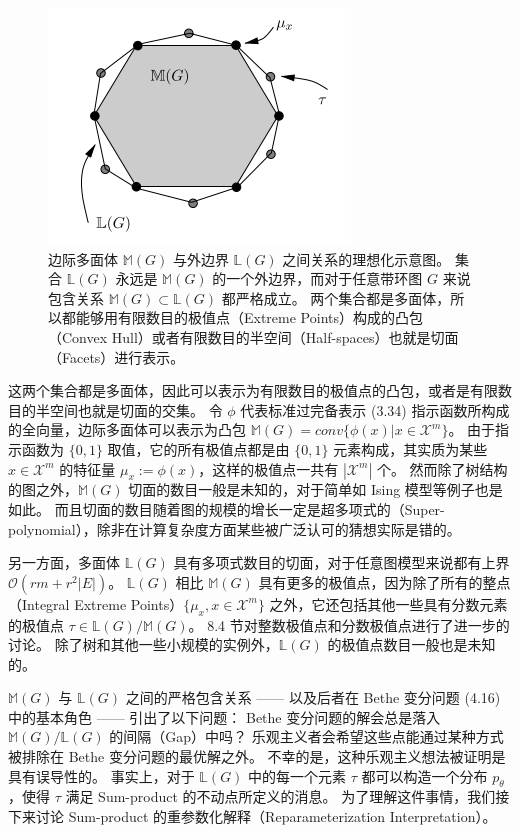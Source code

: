 \begin{figure}[htbp]
    \centering
    \includegraphics[width=.5\linewidth]{figure/4-2.PNG}
    \caption{
        边际多面体 $\mathbb{M}(G)$ 与外边界 $\mathbb{L}(G)$ 之间关系的理想化示意图。
        集合 $\mathbb{L}(G)$ 永远是 $\mathbb{M}(G)$ 的一个外边界，而对于任意带环图 $G$ 来说包含关系 $\mathbb{M}(G) \subset \mathbb{L}(G)$ 都严格成立。
        两个集合都是多面体，所以都能够用有限数目的极值点（Extreme Points）构成的凸包（Convex Hull）或者有限数目的半空间（Half-spaces）也就是切面（Facets）进行表示。
    }\label{fig:4-2}
\end{figure}

这两个集合都是多面体，因此可以表示为有限数目的极值点的凸包，或者是有限数目的半空间也就是切面的交集。
令 $\phi$ 代表标准过完备表示 (3.34) 指示函数所构成的全向量，边际多面体可以表示为凸包 $\mathbb{M}(G) = conv\{\phi(x)| x \in \mathcal{X}^m\}$。
由于指示函数为 $\{0, 1\}$ 取值，它的所有极值点都是由 $\{0, 1\}$ 元素构成，其实质为某些 $x \in \mathcal{X}^m$ 的特征量 $\mu_x := \phi(x)$，这样的极值点一共有 $|\mathcal{X}^m|$ 个。
然而除了树结构的图之外，$\mathbb{M}(G)$ 切面的数目一般是未知的，对于简单如 Ising 模型等例子也是如此。
而且切面的数目随着图的规模的增长一定是超多项式的（Super-polynomial），除非在计算复杂度方面某些被广泛认可的猜想实际是错的。

另一方面，多面体 $\mathbb{L}(G)$ 具有多项式数目的切面，对于任意图模型来说都有上界 $\mathcal{O}(rm+r^2|E|)$。
$\mathbb{L}(G)$ 相比 $\mathbb{M}(G)$ 具有更多的极值点，因为除了所有的整点（Integral Extreme Points）$\{\mu_x, x \in \mathcal{X}^m\}$ 之外，它还包括其他一些具有分数元素的极值点 $\tau \in \mathbb{L}(G)/\mathbb{M}(G)$。
8.4 节对整数极值点和分数极值点进行了进一步的讨论。
除了树和其他一些小规模的实例外，$\mathbb{L}(G)$ 的极值点数目一般也是未知的。

$\mathbb{M}(G)$ 与 $\mathbb{L}(G)$ 之间的严格包含关系 —— 以及后者在 Bethe 变分问题 (4.16) 中的基本角色 —— 引出了以下问题：
Bethe 变分问题的解会总是落入 $\mathbb{M}(G)/\mathbb{L}(G)$ 的间隔（Gap）中吗？
乐观主义者会希望这些点能通过某种方式被排除在 Bethe 变分问题的最优解之外。
不幸的是，这种乐观主义想法被证明是具有误导性的。
事实上，对于 $\mathbb{L}(G)$ 中的每一个元素 $\tau$ 都可以构造一个分布 $p_{\theta}$，使得 $\tau$ 满足 Sum-product 的不动点所定义的消息。
为了理解这件事情，我们接下来讨论 Sum-product 的重参数化解释（Reparameterization Interpretation）。

